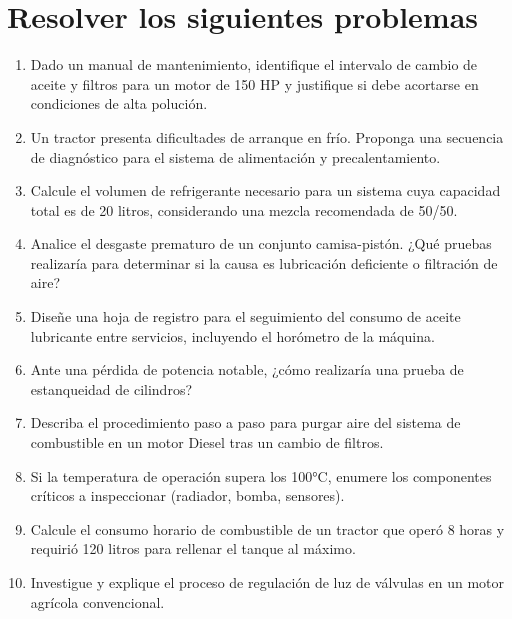 \section*{\faWrench\space Resolver los siguientes problemas}
\begin{enumerate}
	\item Dado un manual de mantenimiento, identifique el intervalo de cambio de
	      aceite y filtros para un motor de 150 HP y justifique si debe acortarse en
	      condiciones de alta polución.
	\item Un tractor presenta dificultades de arranque en frío. Proponga una
	      secuencia de diagnóstico para el sistema de alimentación y precalentamiento.
	\item Calcule el volumen de refrigerante necesario para un sistema cuya capacidad
	      total es de 20 litros, considerando una mezcla recomendada de 50/50.
	\item Analice el desgaste prematuro de un conjunto camisa-pistón. ¿Qué pruebas
	      realizaría para determinar si la causa es lubricación deficiente o
	      filtración de aire?
	\item Diseñe una hoja de registro para el seguimiento del consumo de aceite
	      lubricante entre servicios, incluyendo el horómetro de la máquina.
	\item Ante una pérdida de potencia notable, ¿cómo realizaría una prueba de
	      estanqueidad de cilindros?
	\item Describa el procedimiento paso a paso para purgar aire del sistema de
	      combustible en un motor Diesel tras un cambio de filtros.
	\item Si la temperatura de operación supera los 100°C, enumere los componentes
	      críticos a inspeccionar (radiador, bomba, sensores).
	\item Calcule el consumo horario de combustible de un tractor que operó 8 horas y
	      requirió 120 litros para rellenar el tanque al máximo.
	\item Investigue y explique el proceso de regulación de luz de válvulas en un
	      motor agrícola convencional.
\end{enumerate}
